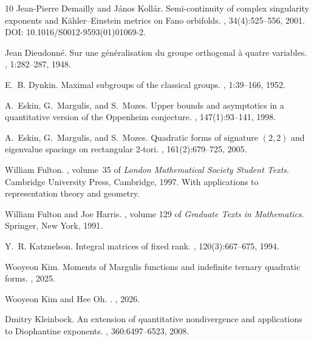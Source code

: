 \documentclass[reqno,11pt]{amsart}
\numberwithin{equation}{section}
\theoremstyle{definition}
\theoremstyle{remark}
\let\hacek=\v %
\renewcommand{\v}{\mathsf v}
\begin{document}
\begin{thebibliography}{10}
Jean-Pierre Demailly and J{\'a}nos Koll{\'a}r.
\newblock Semi-continuity of complex singularity exponents and
{K\"ahler--Einstein} metrics on {Fano} orbifolds.
, 34(4):525--556, 2001.
\newblock DOI: 10.1016/S0012-9593(01)01069-2.

Jean Dieudonn\'e.
\newblock Sur une g\'en\'eralisation du groupe orthogonal \`a quatre variables.
, 1:282--287, 1948.

E.~B. Dynkin.
\newblock Maximal subgroups of the classical groups.
\newblock {\em Trudy Moskov. Mat. Ob\hacek{s}\hacek{c}.}, 1:39--166, 1952.

A.~Eskin, G.~Margulis, and S.~Mozes.
\newblock Upper bounds and asymptotics in a quantitative version of the Oppenheim conjecture.
, 147(1):93--141, 1998.

A.~Eskin, G.~Margulis, and S.~Mozes.
\newblock Quadratic forms of signature $(2, 2)$ and eigenvalue spacings on rectangular 2-tori.
, 161(2):679--725, 2005.

William Fulton.
, volume~35 of {\em London Mathematical Society Student Texts}.
\newblock Cambridge University Press, Cambridge, 1997.
\newblock With applications to representation theory and geometry.

William Fulton and Joe Harris.
, volume 129 of {\em Graduate Texts in Mathematics}.
\newblock Springer, New York, 1991.


Y.~R. Katznelson.
\newblock Integral matrices of fixed rank.
, 120(3):667--675, 1994.

Wooyeon Kim.
\newblock Moments of Margulis functions and indefinite ternary quadratic forms.
, 2025.

Wooyeon Kim and Hee Oh.
.
, 2026.


Dmitry Kleinbock.
\newblock An extension of quantitative nondivergence and applications to Diophantine exponents.
, 360:6497--6523, 2008.


\end{thebibliography}
\end{document}
